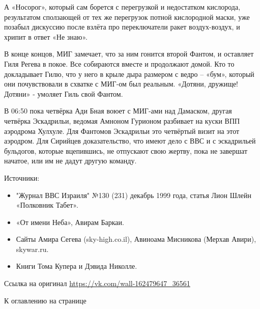 \begin{textcitation}
	А «Носорог», который сам борется с перегрузкой и недостатком кислорода, результатом сползающей от тех же перегрузок потной кислородной маски, уже позабыл дискуссию после взлёта про переключатели ракет воздух-воздух, и хрипит в ответ «Не знаю». 
	
	В конце концов, МИГ замечает, что за ним гонится второй Фантом, и оставляет Гиля Регева в покое. Все собираются вместе и продолжают домой. Кто то докладывает Гилю, что у него в крыле дыра размером с ведро – «бум», который они почувствовали в схватке с МИГ-ом был реальным.
	«Дотяни, дружище! Дотяни» - умоляет Гиль свой Фантом. 
	
	В 06:50 пока четвёрка Ади Бная воюет с МИГ-ами над Дамаском, другая четвёрка Эскадрильи, ведомая Амноном Гурионом разбивает на куски ВПП аэродрома Хулхуле. Для Фантомов Эскадрильи это четвёртый визит на этот аэродром. Для Сирийцев доказательство, что имеют дело с ВВС и с эскадрильей бульдогов, которые вцепившись, не отпускают свою жертву, пока не завершат начатое, или им не дадут другую команду. 
\end{textcitation}

Источники:
\begin{itemize}
	\item "Журнал ВВС Израиля" №130 (231) декабрь 1999 года, статья Лион Шлейн «Полковник Табет».

\item «От имени Неба», Авирам Баркаи.

\item Сайты Амира Сегева (sky-high.co.il), Авиноама Мисникова (Мерхав Авири), skywar.ru.

\item Книги Тома Купера и Дэвида Николле.
\end{itemize}

Ссылка на оригинал \url{https://vk.com/wall-162479647_36561}

К оглавлению на странице \pageref{tablecont}
